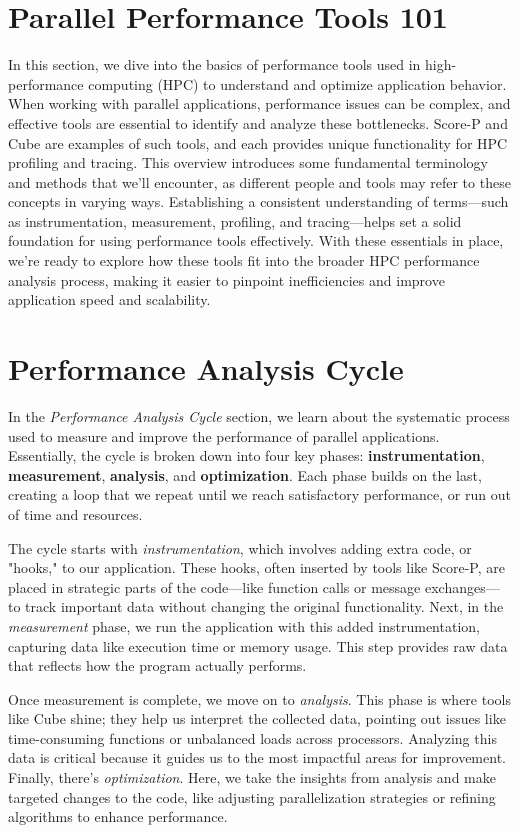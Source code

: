 \documentclass[conference]{IEEEtran}
\begin{document}
\section{Parallel Performance Tools 101}

In this section, we dive into the basics of performance tools used in high-performance computing (HPC) to understand and optimize application behavior. 
When working with parallel applications, performance issues can be complex, and effective tools are essential to identify and analyze these bottlenecks. Score-P and Cube are examples of such tools, and each provides unique functionality for HPC profiling and tracing. This overview introduces some fundamental terminology and methods that we’ll encounter, as different people and tools may refer to these concepts in varying ways. Establishing a consistent understanding of terms—such as instrumentation, measurement, profiling, and tracing—helps set a solid foundation for using performance tools effectively. With these essentials in place, we’re ready to explore how these tools fit into the broader HPC performance analysis process, making it easier to pinpoint inefficiencies and improve application speed and scalability.

\section{Performance Analysis Cycle}
In the \textit{Performance Analysis Cycle} section, we learn about the systematic process used to measure and improve the performance of parallel applications. Essentially, the cycle is broken down into four key phases: \textbf{instrumentation}, \textbf{measurement}, \textbf{analysis}, and \textbf{optimization}. Each phase builds on the last, creating a loop that we repeat until we reach satisfactory performance, or run out of time and resources.

The cycle starts with \textit{instrumentation}, which involves adding extra code, or "hooks," to our application. These hooks, often inserted by tools like Score-P, are placed in strategic parts of the code—like function calls or message exchanges—to track important data without changing the original functionality. Next, in the \textit{measurement} phase, we run the application with this added instrumentation, capturing data like execution time or memory usage. This step provides raw data that reflects how the program actually performs.

Once measurement is complete, we move on to \textit{analysis}. This phase is where tools like Cube shine; they help us interpret the collected data, pointing out issues like time-consuming functions or unbalanced loads across processors. Analyzing this data is critical because it guides us to the most impactful areas for improvement. Finally, there's \textit{optimization}. Here, we take the insights from analysis and make targeted changes to the code, like adjusting parallelization strategies or refining algorithms to enhance performance.
\end{document}
